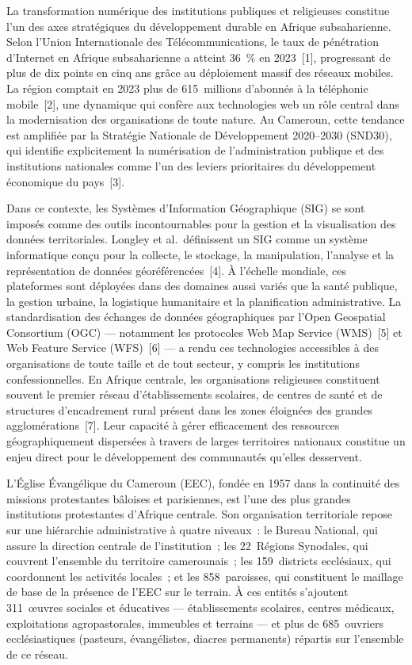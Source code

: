 \documentclass[12pt, a4paper]{report}
\begin{document}
La transformation numérique des institutions publiques et religieuses constitue
l'un des axes stratégiques du développement durable en Afrique subsaharienne.
Selon l'Union Internationale des Télécommunications, le taux de pénétration
d'Internet en Afrique subsaharienne a atteint 36~\% en 2023~[1],
progressant de plus de dix points en cinq ans grâce au déploiement massif des
réseaux mobiles. La région comptait en 2023 plus de 615~millions d'abonnés à la
téléphonie mobile~[2], une dynamique qui confère aux technologies web
un rôle central dans la modernisation des organisations de toute nature. Au
Cameroun, cette tendance est amplifiée par la Stratégie Nationale de
Développement 2020--2030 (SND30), qui identifie explicitement la numérisation de
l'administration publique et des institutions nationales comme l'un des leviers
prioritaires du développement économique du pays~[3].

Dans ce contexte, les Systèmes d'Information Géographique (SIG) se sont imposés
comme des outils incontournables pour la gestion et la visualisation des données
territoriales. Longley et al.~définissent un SIG comme un système informatique
conçu pour la collecte, le stockage, la manipulation, l'analyse et la
représentation de données géoréférencées~[4]. À l'échelle
mondiale, ces plateformes sont déployées dans des domaines aussi variés que la
santé publique, la gestion urbaine, la logistique humanitaire et la planification
administrative. La standardisation des échanges de données géographiques par
l'Open Geospatial Consortium (OGC) --- notamment les protocoles Web Map Service
(WMS)~[5] et Web Feature Service (WFS)~[6] --- a
rendu ces technologies accessibles à des organisations de toute taille et de tout
secteur, y compris les institutions confessionnelles. En Afrique centrale, les
organisations religieuses constituent souvent le premier réseau d'établissements
scolaires, de centres de santé et de structures d'encadrement rural présent dans
les zones éloignées des grandes agglomérations~[7]. Leur capacité
à gérer efficacement des ressources géographiquement dispersées à travers de
larges territoires nationaux constitue un enjeu direct pour le développement
des communautés qu'elles desservent.

L'Église Évangélique du Cameroun (EEC), fondée en 1957 dans la continuité des
missions protestantes bâloises et parisiennes, est l'une des plus grandes
institutions protestantes d'Afrique centrale. Son organisation territoriale
repose sur une hiérarchie administrative à quatre niveaux~: le Bureau National,
qui assure la direction centrale de l'institution~; les 22~Régions Synodales, qui
couvrent l'ensemble du territoire camerounais~; les 159~districts ecclésiaux, qui
coordonnent les activités locales~; et les 858~paroisses, qui constituent le
maillage de base de la présence de l'EEC sur le terrain. À ces entités s'ajoutent
311~œuvres sociales et éducatives --- établissements scolaires, centres médicaux,
exploitations agropastorales, immeubles et terrains --- et plus de
685~ouvriers ecclésiastiques (pasteurs, évangélistes, diacres permanents) répartis
sur l'ensemble de ce réseau.
\end{document}
